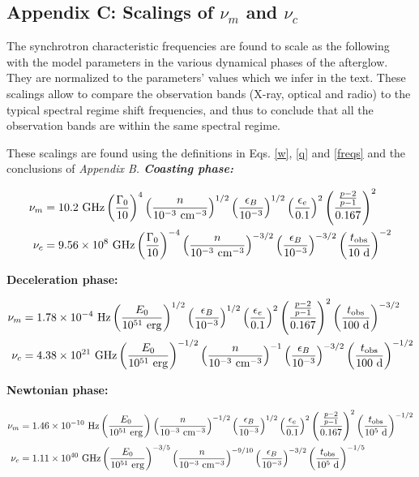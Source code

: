 \newpage
\subsection*{Appendix C: Scalings of $\nu_m$ and $\nu_c$}

The synchrotron characteristic frequencies are found to scale as the following with the model parameters in the various dynamical phases of the afterglow. They are normalized to the parameters' values which we infer in the text. These scalings allow to compare the observation bands (X-ray, optical and radio) to the typical spectral regime shift frequencies, and thus to conclude that all the observation bands are within the same spectral regime.

These scalings are found using the definitions in Eqs. \ref{w}, \ref{q} and \ref{freqs} and the conclusions of \it{Appendix B}.
\bf{Coasting phase:}

\begin{align}
    \nu_m &= 10.2~\rm{GHz} \left(\frac{\Gamma_0}{10} \right)^{4} \left(\frac{n}{10^{-3}~\rm{cm}^{-3}} \right)^{1/2} \left(\frac{\epsilon_B}{10^{-3}} \right)^{1/2} \left(\frac{\epsilon_e}{0.1} \right)^{2} \left(\frac{\frac{p - 2}{p - 1}}{0.167} \right)^{2}\\
    \nu_c &= 9.56 \times 10^8~\rm{GHz} \left(\frac{\Gamma_0}{10} \right)^{-4} \left(\frac{n}{10^{-3}~\rm{cm}^{-3}} \right)^{-3/2} \left(\frac{\epsilon_B}{10^{-3}} \right)^{-3/2}  \left(\frac{t_{\rm{obs}}}{10~\rm{d}} \right)^{-2}
\end{align}


\bf{Deceleration phase:}

\begin{align}
    \nu_m &= 1.78 \times 10^{-4}~\rm{Hz} \left(\frac{E_0}{10^{51}~\rm{erg}} \right)^{1/2}  \left(\frac{\epsilon_B}{10^{-3}} \right)^{1/2} \left(\frac{\epsilon_e}{0.1} \right)^{2} \left(\frac{\frac{p - 2}{p - 1}}{0.167} \right)^{2} \left(\frac{t_{\rm{obs}}}{100~\rm{d}} \right)^{-3/2} \\
    \nu_c &= 4.38 \times 10^{21}~\rm{GHz} \left(\frac{E_0}{10^{51}~\rm{erg}} \right)^{-1/2} \left(\frac{n}{10^{-3}~\rm{cm}^{-3}} \right)^{-1} \left(\frac{\epsilon_B}{10^{-3}} \right)^{-3/2} \left(\frac{t_{\rm{obs}}}{100~\rm{d}} \right)^{-1/2}
\end{align}


\bf{Newtonian phase:}

\begin{align}
    \nu_m &= 1.46 \times 10^{-10}~\rm{Hz} \left(\frac{E_0}{10^{51}~\rm{erg}} \right)^{} \left(\frac{n}{10^{-3}~\rm{cm}^{-3}} \right)^{-1/2} \left(\frac{\epsilon_B}{10^{-3}} \right)^{1/2} \left(\frac{\epsilon_e}{0.1} \right)^{2} \left(\frac{\frac{p - 2}{p - 1}}{0.167} \right)^{2} \left(\frac{t_{\rm{obs}}}{10^5~\rm{d}} \right)^{-1/2}\\
    \nu_c &= 1.11 \times 10^{40}~\rm{GHz} \left(\frac{E_0}{10^{51}~\rm{erg}} \right)^{-3/5} \left(\frac{n}{10^{-3}~\rm{cm}^{-3}} \right)^{-9/10} \left(\frac{\epsilon_B}{10^{-3}} \right)^{-3/2} \left(\frac{t_{\rm{obs}}}{10^5~\rm{d}} \right)^{-1/5}
\end{align}
